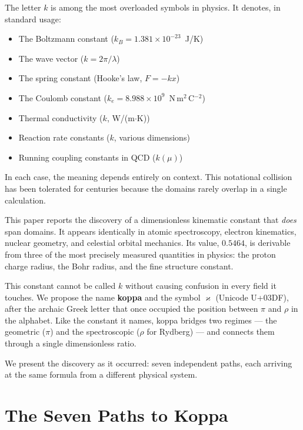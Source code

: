 \documentclass[twocolumn,epjc3]{svjour3}
\newcommand{\kop}{\varkappa}  %
\begin{document}
The letter $k$ is among the most overloaded symbols in physics.  It denotes, in standard usage:
\begin{itemize}
  \item The Boltzmann constant ($k_B = 1.381 \times 10^{-23}$~J/K)
  \item The wave vector ($k = 2\pi/\lambda$)
  \item The spring constant (Hooke's law, $F = -kx$)
  \item The Coulomb constant ($k_e = 8.988 \times 10^9$~N\,m$^2$\,C$^{-2}$)
  \item Thermal conductivity ($k$, W/(m$\cdot$K))
  \item Reaction rate constants ($k$, various dimensions)
  \item Running coupling constants in QCD ($k(\mu)$)
\end{itemize}

In each case, the meaning depends entirely on context.  This notational collision has been tolerated for centuries because the domains rarely overlap in a single calculation.

This paper reports the discovery of a dimensionless kinematic constant that \emph{does} span domains.  It appears identically in atomic spectroscopy, electron kinematics, nuclear geometry, and celestial orbital mechanics.  Its value, $0.5464$, is derivable from three of the most precisely measured quantities in physics: the proton charge radius, the Bohr radius, and the fine structure constant.

This constant cannot be called $k$ without causing confusion in every field it touches.  We propose the name \textbf{koppa} and the symbol $\kop$ (Unicode U+03DF), after the archaic Greek letter that once occupied the position between $\pi$ and $\rho$ in the alphabet.  Like the constant it names, koppa bridges two regimes --- the geometric ($\pi$) and the spectroscopic ($\rho$ for Rydberg) --- and connects them through a single dimensionless ratio.

We present the discovery as it occurred: seven independent paths, each arriving at the same formula from a different physical system.


\section{The Seven Paths to Koppa}
\label{sec:paths}
\end{document}
